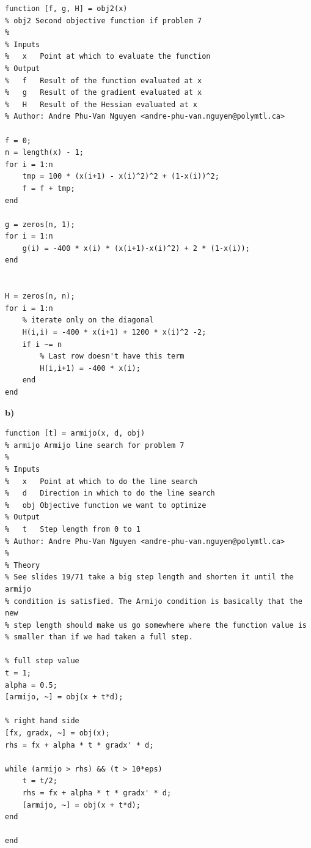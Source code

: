 \begin{lstlisting}[style=Matlab-editor]
function [f, g, H] = obj2(x)
% obj2 Second objective function if problem 7
%   
% Inputs
%   x   Point at which to evaluate the function
% Output 
%   f   Result of the function evaluated at x
%   g   Result of the gradient evaluated at x
%   H   Result of the Hessian evaluated at x
% Author: Andre Phu-Van Nguyen <andre-phu-van.nguyen@polymtl.ca>

f = 0;
n = length(x) - 1;
for i = 1:n
    tmp = 100 * (x(i+1) - x(i)^2)^2 + (1-x(i))^2;
    f = f + tmp;
end

g = zeros(n, 1);
for i = 1:n
    g(i) = -400 * x(i) * (x(i+1)-x(i)^2) + 2 * (1-x(i));
end


H = zeros(n, n);
for i = 1:n
    % iterate only on the diagonal
    H(i,i) = -400 * x(i+1) + 1200 * x(i)^2 -2;
    if i ~= n
        % Last row doesn't have this term
        H(i,i+1) = -400 * x(i);
    end        
end
\end{lstlisting}

\textbf{b)}

\begin{lstlisting}[style=Matlab-editor]
function [t] = armijo(x, d, obj)
% armijo Armijo line search for problem 7
%   
% Inputs
%   x   Point at which to do the line search
%   d   Direction in which to do the line search
%   obj Objective function we want to optimize
% Output 
%   t   Step length from 0 to 1
% Author: Andre Phu-Van Nguyen <andre-phu-van.nguyen@polymtl.ca>
%
% Theory
% See slides 19/71 take a big step length and shorten it until the armijo 
% condition is satisfied. The Armijo condition is basically that the new 
% step length should make us go somewhere where the function value is 
% smaller than if we had taken a full step.

% full step value
t = 1;
alpha = 0.5;
[armijo, ~] = obj(x + t*d);

% right hand side
[fx, gradx, ~] = obj(x);
rhs = fx + alpha * t * gradx' * d;

while (armijo > rhs) && (t > 10*eps) 
    t = t/2;
    rhs = fx + alpha * t * gradx' * d;
    [armijo, ~] = obj(x + t*d);
end

end
\end{lstlisting}

